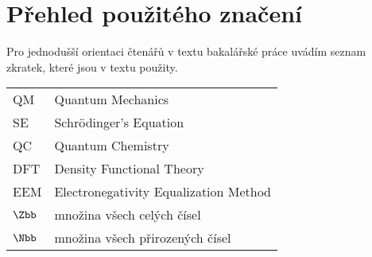 \chapter*{Přehled použitého značení}

Pro jednodušší orientaci čtenářů v textu bakalářské práce uvádím seznam zkratek, které jsou v textu použity.
\begin{flushleft}
\begin{longtable}[l]{ll} %
  QM                 & Quantum Mechanics
  \\[1mm]
  SE                 & Schrödinger's Equation
  \\[1mm]
  QC                 & Quantum Chemistry
  \\[1mm]
  DFT                & Density Functional Theory
  \\[1mm]
  EEM                 & Electronegativity Equalization Method
  \\[1mm]
  $\Zbb$                 & množina všech celých čísel \\[1mm]
  $\Nbb$                 & množina všech přirozených čísel\\[1mm]

\end{longtable}
\end{flushleft}
